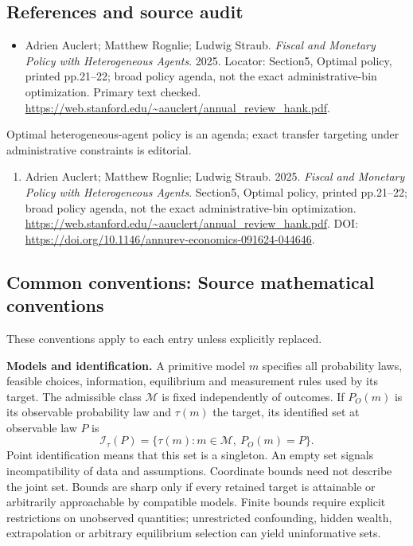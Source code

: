 \documentclass[11pt,a4paper]{article}
\begin{document}
\subsection*{References and source audit}
\begin{itemize}
\item Adrien Auclert; Matthew Rognlie; Ludwig Straub. \emph{Fiscal and Monetary Policy with Heterogeneous Agents}. 2025. Locator: Section5, Optimal policy, printed pp.21--22; broad policy agenda, not the exact administrative-bin optimization. Primary text checked. \url{https://web.stanford.edu/~aauclert/annual_review_hank.pdf}.
\end{itemize}
Optimal heterogeneous-agent policy is an agenda; exact transfer targeting under administrative constraints is editorial.
\begin{enumerate}\raggedright
\item\hypertarget{definitions:source:30007534:1}{} Adrien Auclert; Matthew Rognlie; Ludwig Straub. 2025. \emph{Fiscal and Monetary Policy with Heterogeneous Agents}. Section5, Optimal policy, printed pp.21--22; broad policy agenda, not the exact administrative-bin optimization.
\url{https://web.stanford.edu/~aauclert/annual_review_hank.pdf}.
DOI: \url{https://doi.org/10.1146/annurev-economics-091624-044646}.
\end{enumerate}

\subsection*{Common conventions: Source mathematical conventions}

These conventions apply to each entry unless explicitly replaced.

\textbf{Models and identification.} A primitive model \(m\) specifies all probability laws, feasible choices, information, equilibrium and measurement rules used by its target. The admissible class \(\mathcal M\) is fixed independently of outcomes. If \(P_O(m)\) is its observable probability law and \(\tau(m)\) the target, its identified set at observable law \(P\) is
\[
 \mathcal I_\tau(P)=\{\tau(m):m\in\mathcal M,\ P_O(m)=P\}.
\]
Point identification means that this set is a singleton. An empty set signals incompatibility of data and assumptions. Coordinate bounds need not describe the joint set. Bounds are sharp only if every retained target is attainable or arbitrarily approachable by compatible models. Finite bounds require explicit restrictions on unobserved quantities; unrestricted confounding, hidden wealth, extrapolation or arbitrary equilibrium selection can yield uninformative sets.
\end{document}
